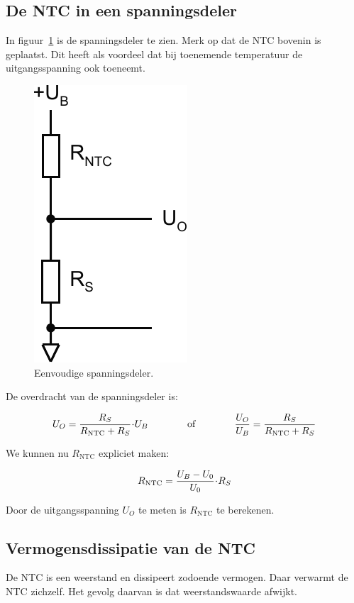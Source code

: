 \documentclass[12pt,a4paper,final,twoside,fleqn]{article}
\newcommand{\rntc}{R_\text{NTC}}
\let\oldcdot\cdot
\renewcommand{\cdot}{\kern-.10em\oldcdot\kern-.10em}
\begin{document}
\subsection{De NTC in een spanningsdeler}
In figuur~\ref{fig:ntc_voltagediv} is de spanningsdeler te zien. Merk op dat
de NTC bovenin is geplaatst. Dit heeft als voordeel dat bij toenemende temperatuur
de uitgangsspanning ook toeneemt.

\begin{figure}[ht!]
\centering
\includegraphics[scale=0.63]{drawings/ntc_voltagediv}
\caption[Eenvoudige spanningsdeler]{Eenvoudige spanningsdeler.}
\label{fig:ntc_voltagediv}
\end{figure}

De overdracht van de spanningsdeler is:

\begin{equation}
U_O = \dfrac{R_S}{\rntc + R_S}\cdot U_B \qquad\qquad\text{of}\qquad\qquad \dfrac{U_O}{U_B}=\dfrac{R_S}{\rntc + R_S}
\end{equation}

We kunnen nu $\rntc$ expliciet maken:

\begin{equation}
\rntc = \dfrac{U_B-U_0}{U_0}\cdot R_S
\end{equation}

Door de uitgangsspanning $U_O$ te meten is $\rntc$ te berekenen.

\subsection{Vermogensdissipatie van de NTC}
De NTC is een weerstand en dissipeert zodoende vermogen. Daar verwarmt de NTC
zichzelf. Het gevolg daarvan is dat weerstandswaarde afwijkt.
\end{document}
